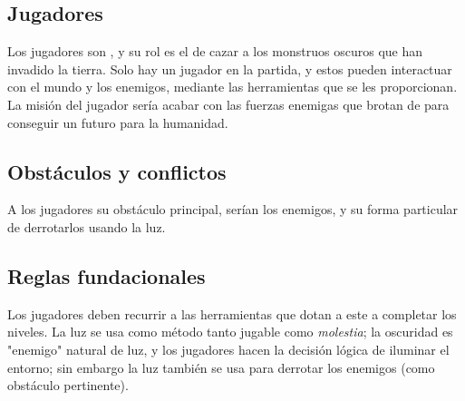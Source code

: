     \subsection{Jugadores}
        Los jugadores son \hunters, y su rol es el de cazar a los monstruos oscuros que han invadido la tierra. Solo hay un jugador en la partida, y estos pueden interactuar con el mundo y los enemigos, mediante las herramientas que se les proporcionan.
        La misión del jugador sería acabar con las fuerzas enemigas que brotan de \hole para conseguir un futuro para la humanidad.

    \subsection{Obstáculos y conflictos}
        A los jugadores su obstáculo principal, serían los enemigos, y su forma particular de derrotarlos usando la luz.
    \subsection{Reglas fundacionales}
        Los jugadores deben recurrir a las herramientas que dotan a este a completar los niveles. La luz se usa como método tanto jugable como \textit{molestia}; la oscuridad es "enemigo" natural de luz, y los jugadores hacen la decisión lógica de iluminar el entorno; sin embargo la luz también se usa para derrotar los enemigos (como obstáculo pertinente).
